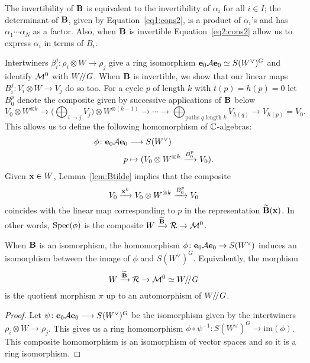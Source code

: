 \documentclass{amsart}
\theoremstyle{definition}
\begin{document}
\begin{remark}
The invertibility of $\mathbf{B}$ is equivalent to the invertibility of $\alpha_i$ for all $i \in I$; the determinant of $\mathbf{B}$, given by Equation~\ref{eq1:cons2}, is a product of $\alpha_i$'s and has $\alpha_1 \cdots \alpha_N$ as a factor.
Also, when $\mathbf{B}$ is invertible Equation~\ref{eq2:cons2} allow us to express $\alpha_i$ in terms of $B_i$.
\end{remark}

Intertwiners $\beta_i^j \colon \rho_i \otimes W \rightarrow \rho_j$ give a ring isomorphism $\mathbf{e}_0 \mathcal{A} \mathbf{e}_0 \simeq S(W^\vee)^G$ and identify $\mathcal{M}^0$ with $W / \! /_{} G$.
When $\mathbf{B}$ is invertible, we show that our linear maps $B_i^j \colon V_i \otimes W \rightarrow V_j$ do so too.
For a cycle $p$ of length $k$ with $t(p)=h(p)=0$ let $B_0^p$ denote the composite given by successive applications of $\mathbf{B}$ below $$V_0 \otimes W^{\otimes k} \longrightarrow \Bigg(\bigoplus_{i \rightarrow j} V_j\Bigg) \otimes W^{\otimes (k-1)} \rightarrow \cdots \rightarrow \bigoplus_{\text{paths } q \text{ length } k} V_{h(q)} \rightarrow V_{h(p)}=V_0.$$
This allows us to define the following homomorphism of $\mathbb{C}$-algebras:
\begin{align*}
\phi \colon \mathbf{e}_0 \mathcal{A} \mathbf{e}_0 &\longrightarrow S(W^\vee)
\\ p &\mapsto (V_0 \otimes W^{\otimes k} \xrightarrow{B_0^p} V_0).
\end{align*}
Given $\mathbf{x} \in W$, Lemma~\ref{lem:Btilde} implies that the composite $$V_0 \xrightarrow{\mathbf{x}^k} V_0 \otimes W^{\otimes k} \xrightarrow{B_0^p} V_0$$ coincides with the linear map corresponding to $p$ in the representation $\widetilde{\mathbf{B}}(\mathbf{x})$.
In other words, $\operatorname{Spec}(\phi)$ is the composite $W \xrightarrow{\widetilde{\mathbf{B}}} \mathcal{R} \rightarrow \mathcal{M}^0$.

\begin{lemma}\label{lem:e0Ae0}
When $\mathbf{B}$ is an isomorphism, the homomorphism $\phi \colon \mathbf{e}_0 \mathcal{A} \mathbf{e}_0 \rightarrow S(W^\vee)$
induces an isomorphism between the image of $\phi$ and $S(W^\vee)^G$.
Equivalently, the morphism $$W \xrightarrow{\widetilde{\mathbf{B}}} \mathcal{R} \rightarrow \mathcal{M}^0 \simeq W / \! /_{} G$$ is the quotient morphism $\pi$ up to an automorphism of $W/ \! /_{} G$.
\end{lemma}

\begin{proof}
Let $\psi \colon \mathbf{e}_0 \mathcal{A} \mathbf{e}_0 \longrightarrow S(W^\vee)^G$ be the isomorphism given by the intertwiners $\rho_i \otimes W \rightarrow \rho_j$.
This gives us a ring homomorphism $\phi \circ \psi^{-1} \colon S(W^\vee)^G \rightarrow \text{im}(\phi)$.
This composite homomorphism is an isomorphism of vector spaces and so it is a ring isomorphism.
\end{proof}
\end{document}

